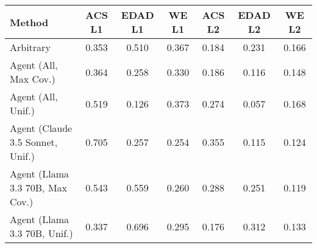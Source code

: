 \begin{tabular}{lcccccc}
\toprule
Method & ACS L1 & EDAD L1 & WE L1 & ACS L2 & EDAD L2 & WE L2 \\
\midrule
Arbitrary & \cellcolor{silver!30}0.353 & 0.510 & 0.367 & \cellcolor{silver!30}0.184 & 0.231 & 0.166 \\
Agent (All, Max Cov.) & \cellcolor{bronze!30}0.364 & \cellcolor{bronze!30}0.258 & 0.330 & \cellcolor{bronze!30}0.186 & \cellcolor{bronze!30}0.116 & 0.148 \\
Agent (All, Unif.) & 0.519 & \cellcolor{gold!30}0.126 & 0.373 & 0.274 & \cellcolor{gold!30}0.057 & 0.168 \\
Agent (Claude 3.5 Sonnet, Unif.) & 0.705 & \cellcolor{silver!30}0.257 & \cellcolor{gold!30}0.254 & 0.355 & \cellcolor{silver!30}0.115 & \cellcolor{silver!30}0.124 \\
Agent (Llama 3.3 70B, Max Cov.) & 0.543 & 0.559 & \cellcolor{silver!30}0.260 & 0.288 & 0.251 & \cellcolor{gold!30}0.119 \\
Agent (Llama 3.3 70B, Unif.) & \cellcolor{gold!30}0.337 & 0.696 & \cellcolor{bronze!30}0.295 & \cellcolor{gold!30}0.176 & 0.312 & \cellcolor{bronze!30}0.133 \\
\bottomrule
\end{tabular}